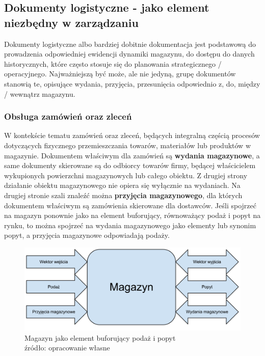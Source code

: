 	\subsection{Dokumenty logistyczne - jako element niezbędny w zarządzaniu}
		Dokumenty logistyczne albo bardziej dobitnie dokumentacja jest podstawową do prowa\-dzenia odpowiedniej
		ewidencji dynamiki magazynu, do dostępu do danych historycznych, które często stosuje się
		do planowania strategicznego / operacyjnego. Najważniejszą być może, ale nie jedyną, grupę dokumentów
		stanowią te, opisujące wydania, przyjęcia, przesunięcia odpowiednio z, do, między / wewnątrz magazynu.
	\subsubsection{Obsługa zamówień oraz zleceń}
		W kontekście tematu zamówień oraz zleceń, będących integralną częścią procesów dotyczących fizycznego
		przemieszczania towarów, materiałów lub produktów w magazynie. Dokumentem właściwym dla zamówień są
		\textbf{wydania magazynowe}, a same dokumenty skierowane są do odbiorcy towarów firmy, będącej właścicielem
		wykupionych powierzchni magazynowych lub całego obiektu. Z drugiej strony działanie obiektu magazynowego
		nie opiera się wyłącznie na wydaniach. Na drugiej stronie szali znaleźć można \textbf{przyjęcia magazynowego},
		dla których dokumentem właściwym są zamówienia skierowane dla dostawców. Jeśli spojrzeć na magazyn ponownie jako
		na element buforujący, równoważący podaż i popyt na rynku, to można spojrzeć na wydania magazynowego jako
		elementy lub synonim popyt, a przyjęcia magazynowe odpowiadają podaży. 
		
		\begin{figure}[H]
			\centering
			\includegraphics[width=\textwidth]{images/warehouse_buffer}
			\caption[Magazyn jako bufor]{
				Magazyn jako element buforujący podaż i popyt\\
				źródło: opracowanie własne
			}
		\end{figure}
		
